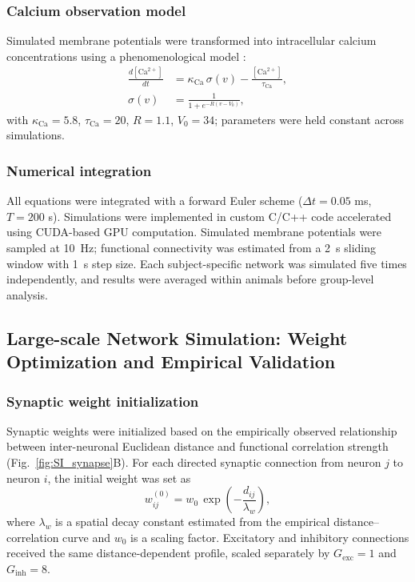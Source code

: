 \documentclass[9pt,twoside]{pnas-new}
\begin{document}
\subsubsection*{Calcium observation model}

Simulated membrane potentials were transformed into intracellular calcium concentrations using a phenomenological model \citep{rahmati2016inferring,yaksi2006reconstruction}:
\begin{align}
\frac{d[\mathrm{Ca}^{2+}]}{dt} &= \kappa_{\mathrm{Ca}} \, \sigma(v) - \frac{[\mathrm{Ca}^{2+}]}{\tau_{\mathrm{Ca}}}, \\
\sigma(v) &= \frac{1}{1 + e^{-R(v - V_0)}},
\end{align}
with $\kappa_{\mathrm{Ca}} = 5.8$, $\tau_{\mathrm{Ca}} = 20$, $R = 1.1$, $V_0 = 34$; parameters were held constant across simulations.

\subsubsection*{Numerical integration}

All equations were integrated with a forward Euler scheme ($\Delta t = 0.05$ ms, $T = 200$ s). Simulations were implemented in custom C/C++ code accelerated using CUDA-based GPU computation. Simulated membrane potentials were sampled at 10~Hz; functional connectivity was estimated from a 2~s sliding window with 1~s step size. Each subject-specific network was simulated five times independently, and results were averaged within animals before group-level analysis.

\subsection*{Large-scale Network Simulation: Weight Optimization and Empirical Validation}

\subsubsection*{Synaptic weight initialization}

Synaptic weights were initialized based on the empirically observed relationship between inter-neuronal Euclidean distance and functional correlation strength (Fig.~\ref{fig:SI_synapse}B). For each directed synaptic connection from neuron $j$ to neuron $i$, the initial weight was set as
\begin{equation}
  w_{ij}^{(0)} = w_0 \, \exp\!\left(-\frac{d_{ij}}{\lambda_w}\right),
\end{equation}
where $\lambda_w$ is a spatial decay constant estimated from the empirical distance--correlation curve and $w_0$ is a scaling factor. Excitatory and inhibitory connections received the same distance-dependent profile, scaled separately by $G_{\mathrm{exc}}=1$ and $G_{\mathrm{inh}}=8$.
\end{document}
